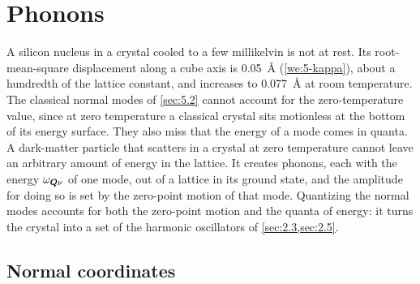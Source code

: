 \section{Phonons}\label{sec:5.3}

A silicon nucleus in a crystal cooled to a few millikelvin is not at rest. Its root-mean-square displacement along a cube axis is \SI{0.05}{\angstrom} (\cref{we:5-kappa}), about a hundredth of the lattice constant, and increases to \SI{0.077}{\angstrom} at room temperature. The classical normal modes of \cref{sec:5.2} cannot account for the zero-temperature value, since at zero temperature a classical crystal sits motionless at the bottom of its energy surface. They also miss that the energy of a mode comes in quanta. A dark-matter particle that scatters in a crystal at zero temperature cannot leave an arbitrary amount of energy in the lattice. It creates phonons, each with the energy $\omega_{\bm{Q}\nu}$ of one mode, out of a lattice in its ground state, and the amplitude for doing so is set by the zero-point motion of that mode. Quantizing the normal modes accounts for both the zero-point motion and the quanta of energy: it turns the crystal into a set of the harmonic oscillators of \cref{sec:2.3,sec:2.5}.

\subsection{Normal coordinates}

